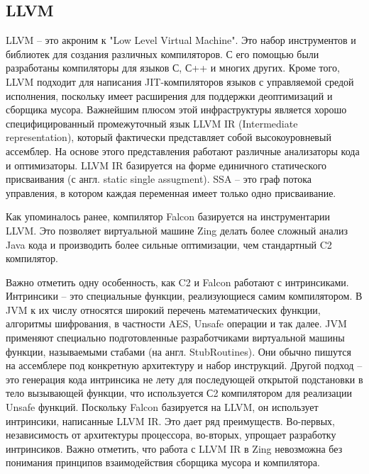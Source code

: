 \subsection{LLVM}
LLVM -- это акроним к "Low Level Virtual Machine". Это набор инструментов и библиотек для 
создания различных компиляторов. С его помощью были разработаны компиляторы для языков С, С++ и многих других. Кроме того, LLVM подходит для написания JIT-компиляторов языков с управляемой средой исполнения, поскольку имеет расширения для поддержки деоптимизаций и сборщика мусора. 
Важнейшим плюсом этой инфраструктуры является хорошо специфицированный промежуточный язык LLVM IR\cite{llvm-ref-man} (Intermediate representation), который фактически представляет собой высокоуровневый ассемблер. 
На основе этого представления работают различные анализаторы кода и оптимизаторы.
LLVM IR базируется на форме единичного статического присваивания (с англ. static single assugment). SSA -- это граф потока управления, в котором каждая переменная имеет только одно присваивание\cite{ssa-book}.
\par
Как упоминалось ранее, компилятор Falcon базируется на инструментарии LLVM. Это позволяет 
виртуальной машине Zing делать более сложный анализ Java кода и производить более сильные оптимизации, чем стандартный C2 компилятор\cite{falcon-gil}.
\par
Важно отметить одну особенность, как C2 и Falcon работают с интринсиками. 
Интринсики -- это специальные функции, реализующиеся самим компилятором. В JVM к их числу относятся широкий перечень математических функции, алгоритмы шифрования, в частности AES, Unsafe операции и так далее.
JVM применяют специально подготовленные разработчиками виртуальной машины функции, называемыми стабами (на англ. StubRoutines). Они обычно пишутся на ассемблере под конкретную
архитектуру и набор инструкций. Другой подход -- это генерация кода интринсика не лету для последующей открытой подстановки в тело вызывающей функции, что используется С2 компилятором для реализации Unsafe функций.
Поскольку Falcon базируется на LLVM, он использует интринсики, написанные LLVM IR. Это дает ряд преимуществ. Во-первых, независимость от архитектуры процессора, во-вторых, упрощает разработку интринсиков.
Важно отметить, что работа с LLVM IR в Zing невозможна без понимания принципов взаимодействия сборщика мусора и компилятора.

